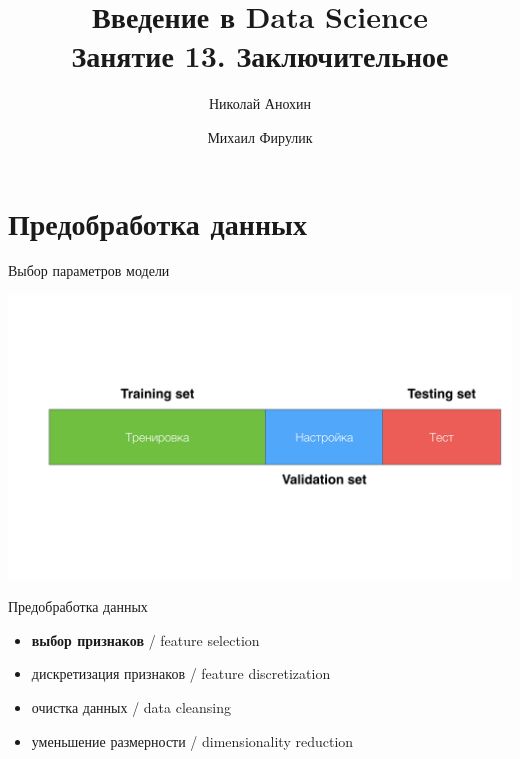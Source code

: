 \documentclass[10pt,a4paper]{beamer}
\author{Николай Анохин \and Михаил Фирулик}
\title{Введение в Data Science \\ Занятие 13. Заключительное}
\begin{document}
\maketitle


\begin{frame}

\tableofcontents

\end{frame}


\section{Предобработка данных}


\begin{frame}{Выбор параметров модели}

\begin{center}
\hspace{-3em}
\includegraphics[scale=0.15]{images/vtt.png}
\end{center}

\end{frame}


\begin{frame}{Предобработка данных}

\begin{itemize}
\item {\bf выбор признаков} / feature selection
\item дискретизация признаков / feature discretization
\item очистка данных / data cleansing
\item уменьшение размерности / dimensionality reduction
\end{itemize}

\end{frame}
\end{document}
